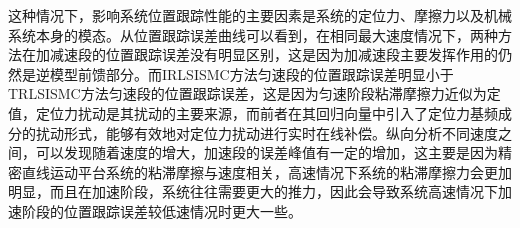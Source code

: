 这种情况下，影响系统位置跟踪性能的主要因素是系统的定位力、摩擦力以及机械系统本身的模态。从位置跟踪误差曲线可以看到，在相同最大速度情况下，两种方法在加减速段的位置跟踪误差没有明显区别，这是因为加减速段主要发挥作用的仍然是逆模型前馈部分。而IRLSISMC方法匀速段的位置跟踪误差明显小于TRLSISMC方法匀速段的位置跟踪误差，这是因为匀速阶段粘滞摩擦力近似为定值，定位力扰动是其扰动的主要来源，而前者在其回归向量中引入了定位力基频成分的扰动形式，能够有效地对定位力扰动进行实时在线补偿。纵向分析不同速度之间，可以发现随着速度的增大，加速段的误差峰值有一定的增加，这主要是因为精密直线运动平台系统的粘滞摩擦与速度相关，高速情况下系统的粘滞摩擦力会更加明显，而且在加速阶段，系统往往需要更大的推力，因此会导致系统高速情况下加速阶段的位置跟踪误差较低速情况时更大一些。
\begin{figure}[H]\centering
	\\
	\\
\end{figure}
